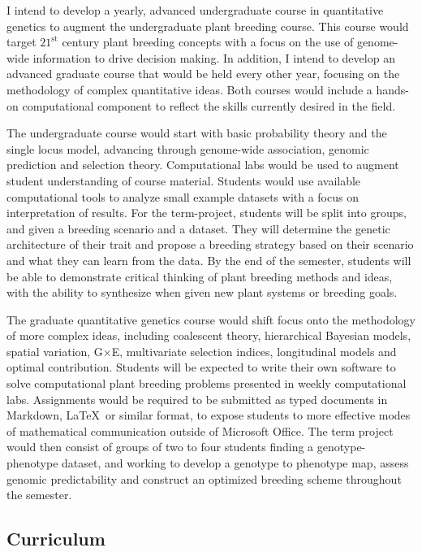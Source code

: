 \documentclass[11pt]{article}
\begin{document}
I intend to develop a yearly, advanced undergraduate course in quantitative genetics to augment the undergraduate plant breeding course. This course would target $21^\text{st}$ century plant breeding concepts with a focus on the use of genome-wide information to drive decision making. In addition, I intend to develop an advanced graduate course that would be held every other year, focusing on the methodology of complex quantitative ideas. Both courses would include a hands-on computational component to reflect the skills currently desired in the field.

The undergraduate course would start with basic probability theory and the single locus model, advancing through genome-wide association, genomic prediction and selection theory. Computational labs would be used to augment student understanding of course material. Students would use available computational tools to analyze small example datasets with a focus on interpretation of results. For the term-project, students will be split into groups, and given a breeding scenario and a dataset. They will determine the genetic architecture of their trait and propose a breeding strategy based on their scenario and what they can learn from the data. By the end of the semester, students will be able to demonstrate critical thinking of plant breeding methods and ideas, with the ability to synthesize when given new plant systems or breeding goals. 

The graduate quantitative genetics course would shift focus onto the methodology of more complex ideas, including coalescent theory, hierarchical Bayesian models, spatial variation, G$\times$E, multivariate selection indices, longitudinal models and optimal contribution. Students will be expected to write their own software to solve computational plant breeding problems presented in weekly computational labs. Assignments would be required to be submitted as typed documents in Markdown, \LaTeX\ or similar format, to expose students to more effective modes of mathematical communication outside of Microsoft Office. The term project would then consist of groups of two to four students finding a genotype-phenotype dataset, and working to develop a genotype to phenotype map, assess genomic predictability and construct an optimized breeding scheme throughout the semester. 

\subsection*{Curriculum}
\end{document}
